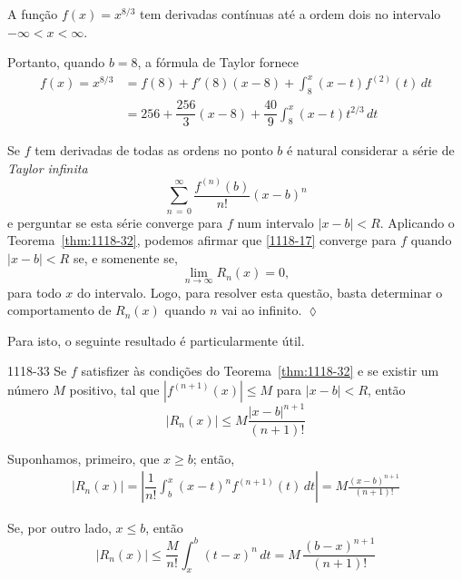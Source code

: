\begin{exer} A função $f(x) = x^{8/3}$ tem derivadas contínuas até a ordem
dois no intervalo $-\infty < x < \infty$.
\end{exer}

\solo Portanto, quando $b = 8$, a fórmula de Taylor fornece
\begin{align*}
f(x) = x^{8/3}&=f(8)+f'(8)(x-8)+\int_8^x(x-t)f^{(2)}(t)\, dt \\[2ex]
    &=256+\dfrac{256}{3}(x-8)+\dfrac{40}{9}\int_8^x(x-t)t^{2/3}\, dt
\end{align*}

Se $f$ tem derivadas de todas as ordens no ponto \(b\) é 
natural considerar a série de \textit{Taylor infinita}
\begin{equation}\label{1118-17}
\sum_{n\, =\, 0}^{\infty}\dfrac{f^{(n)}(b)}{n!}(x-b)^{n}
\end{equation}
e perguntar se esta série converge para $f$ num intervalo $|x - b|
< R$. Aplicando o Teorema~\ref{thm:1118-32}, podemos afirmar que
\eqref{1118-17} converge para $f$ quando $|x - b| < R$ se, e
somenente se,
\begin{equation*}
  \lim_{n\to\infty} R_n(x) = 0,
\end{equation*}
para todo $x$ do intervalo. Logo, para resolver esta questão, basta determinar o comportamento 
de $R_n(x)$ quando $n$ vai ao infinito.
\hfill \(\lozenge\)

Para isto, o seguinte resultado é particularmente útil.

\begin{theoc}{}{1118-33}
Se $f$ satisfizer às condições do Teorema~\ref{thm:1118-32} e se
existir um número $M$ positivo, tal que $|f^{(n+1)}(x)|\leq M$ para $|x-b| < R$, então
\begin{equation}\label{1118-18}
|R_n(x)|\leq M \frac{|x - b|^{n+1} }{(n + 1 )!}
\end{equation}
\end{theoc}

\prova Suponhamos, primeiro, que $x\geq b$; então,
\begin{align*}
  |R_n(x)|=\left|\dfrac{1}{n!}\int_{b}^x(x-t)^nf^{(n+1)}(t)\, dt \right|
  =M\frac{(x-b)^{n+1}}{(n+1)!}
\end{align*}

Se, por outro lado, $x\leq b$, então
\begin{equation*}
  |R_n(x)|\leq \dfrac{M}{n!}\int^{b}_x(t-x)^n\,dt =M\,\dfrac{(b-x)^{n+1}}{(n+1)!}
\end{equation*}

